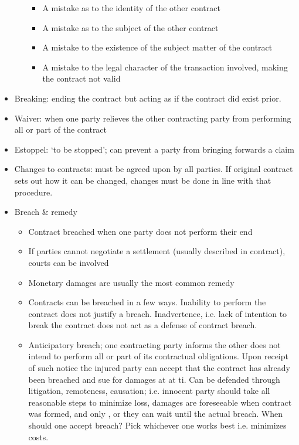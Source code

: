 \documentclass[10pt]{article}
\begin{document}
\begin{itemize}
\begin{itemize}
				\begin{itemize}
					\item A mistake as to the identity of the other contract
					\item A mistake as to the subject of the other contract
					\item A mistake to the existence of the subject matter of the contract
					\item A mistake to the legal character of the transaction involved, making the contract not valid	
				\end{itemize}
		\end{itemize}

	\item Breaking: ending the contract but acting as if the contract did exist prior.

	\item Waiver: when one party relieves the other contracting party from performing all or part of the contract
	\item Estoppel: `to be stopped'; can prevent a party from bringing forwards a claim
	\item Changes to contracts: must be agreed upon by all parties. If original contract sets out how it can be changed, changes must be done in line with that procedure.
	\item Breach  \& remedy
		\begin{itemize}
			\item Contract breached when one party does not perform their end
			\item If parties cannot negotiate a settlement (usually described in contract), courts can be involved
			\item Monetary damages are usually the most common remedy
			\item Contracts can be breached in a few ways. Inability to perform the contract does not justify a breach. Inadvertence, i.e. lack of intention to break the contract does not act as a defense of contract breach.	 
			\item Anticipatory breach; one contracting party informs the other does not intend to perform all or part of its contractual obligations. Upon receipt of such notice the injured party can accept that the contract has already been breached and sue for damages at at ti. Can be defended through litigation, remoteness, causation; i.e. innocent party should take all reasonable steps to minimize loss, damages are foreseeable when contract was formed, and only , or they can wait until the actual breach.
				When should one accept breach? Pick whichever one works best i.e. minimizes costs.
		\end{itemize}


\end{itemize}
\end{document}
